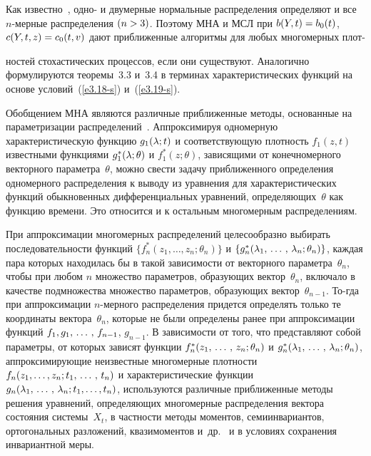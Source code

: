 \begin{multicols}{2}
\smallskip

Как известно~\cite{1-s, 2-s}, одно- и двумерные нормальные распределения
определяют и все  $n$-мер\-ные распределения $(n\hm> 3)$. Поэтому МНА и
МСЛ  при $b(Y,t)\hm=b_0(t)$, $c(Y,t,z) \hm=c_0 (t,v)$ дают приближенные
алгоритмы для любых многомерных плот-\linebreak\vspace*{-12pt}
\columnbreak

\noindent
ностей стохастических процессов,
если они существуют. Аналогично формулируются теоремы~3.3 и~3.4 в
терминах характеристических функций на основе условий~(\ref{e3.18-s}) и~(\ref{e3.19-s}).

 Обобщением МНА являются различные
приближенные методы, основанные на параметризации распределений~\cite{1-s, 2-s}.
Аппроксимируя одномерную характеристическую функцию $g_1 (\lambda;t)$
и соответствующую плотность $f_1 (z,t)$ известными функциями
 $g_1^* (\lambda;\theta)$ и $f_1^* (z;\theta)$,  зависящими от
конечномерного векторного параметра~$\theta$, можно свести задачу
приближенного определения одномерного распределения к выводу из
уравнения для характеристических функций обыкновенных
дифференциальных уравнений, определяющих~$\theta$ как функцию
времени. Это относится и к остальным многомерным распределениям.

При аппроксимации многомерных распределений целесообразно выбирать
последовательности функций $\{ f_n^* (z_1,\ldots,z_n;\theta_n)\}$ и
$\{g_n^* (\lambda_1,\,\ldots\,,\, \lambda_n;\theta_n)\}$, каждая пара
которых находилась бы в такой  зависимости от векторного параметра~$\theta_n$,
чтобы при любом $n$ множество параметров, образу\-ющих
вектор~$\theta_n$, включало в качестве подмножества множество
параметров, образующих вектор~$\theta_{n-1}$. То-\linebreak гда при
аппроксимации $n$-мер\-но\-го распределения придется определять только
те координаты вектора~$\theta_n$, которые не были определены ранее
при аппроксимации функций $f_1, g_1,\,\ldots\,,\, f_{n-1}$, $g_{n-1}$. %
В зависимости от того, что представ\-ляют собой параметры, от
которых зависят функции $f_n^* (z_1,\,\ldots\,,\, z_n;\theta_n)$ и $g_n^*
(\lambda_1,\,\ldots\,,\, \lambda_n;\theta_n)$, аппроксими\-ру\-ющие неизвестные
многомерные плотности $f_n (z_1,  \ldots,z_n; t_1 ,\,\ldots\,,\, t_n)$ и
характеристические функции $g_n (\lambda_1,\,\ldots\,,\, \lambda_n; t_1,\ldots,t_n)$,
используются различные приближенные методы решения
 уравнений, определяющих многомерные
распределения вектора состояния системы~$X_t$, в частности методы
моментов, семиинвариантов, ортогональных разложений, квазимоментов
и~др.~\cite{1-s, 2-s} и в условиях сохранения инвариантной меры.


\end{multicols}
